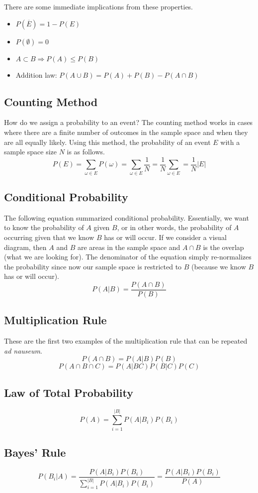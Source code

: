 \documentclass[10pt]{article}
\newenvironment{mitemize}
{
  \begin{itemize}
  \setlength{\itemsep}{1pt}
  \setlength{\parskip}{0pt}
  \setlength{\parsep}{0pt}}{\end{itemize}
}
\begin{document}
There are some immediate implications from these properties.
\begin{mitemize}
\item $P(\overline{E}) = 1 - P(E)$
\item $P(\emptyset) = 0$
\item $A \subset B \Rightarrow P(A) \leq P(B)$
\item Addition law: $P(A \cup B) = P(A) + P(B) - P(A \cap B)$
\end{mitemize}

\subsection*{Counting Method}
How do we assign a probability to an event? The counting method works in cases where there are a finite number of outcomes in the sample space and when they are all equally likely. Using this method, the probability of an event $E$ with a sample space size $N$ is as follows.
\[ P(E) = \sum_{\omega \in E}P(\omega) = \sum_{\omega \in E}\frac{1}{N} = \frac{1}{N}\sum_{\omega \in E} = \frac{1}{N}|E| \]

\subsection*{Conditional Probability}
The following equation summarized conditional probability. Essentially, we want to know the probability of $A$ given $B$, or in other words, the probability of $A$ occurring given that we know $B$ has or will occur. If we consider a visual diagram, then $A$ and $B$ are areas in the sample space and $A \cap B$ is the overlap (what we are looking for). The denominator of the equation simply re-normalizes the probability since now our sample space is restricted to $B$ (because we know $B$ has or will occur).
\[ P(A|B) = \frac{P(A \cap B)}{P(B)} \]

\subsection*{Multiplication Rule}
These are the first two examples of the multiplication rule that can be repeated \textit{ad nauseum}.
\[ P(A \cap B) = P(A|B)P(B) \]
\[ P(A \cap B \cap C) = P(A|BC)P(B|C)P(C) \]

\subsection*{Law of Total Probability}
\[ P(A) = \sum_{i=1}^{|B|}P(A|B_i)P(B_i) \]

\subsection*{Bayes' Rule}
\[ P(B_i|A) = \frac{P(A|B_i)P(B_i)}{\sum_{i=1}^{|B|}P(A|B_i)P(B_i)} = \frac{P(A|B_i)P(B_i)}{P(A)} \]
\end{document}
